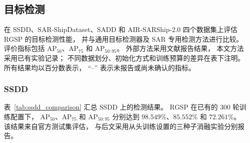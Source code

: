 \documentclass[journal]{IEEEtran}
\begin{document}
\subsection{目标检测}
\label{sec:detection_results}

在 SSDD、SAR-ShipDataset、SADD 和 AIR-SARShip-2.0
四个数据集上评估 RGSP 的目标检测性能，
并与通用目标检测器及 SAR 专用检测方法进行比较。
评价指标包括 AP$_{50}$、AP$_{75}$ 和 AP$_{50:95}$。
外部方法采用文献报告结果，
本文方法采用已有实验记录；
不同数据划分、初始化方式和训练预算的差异在表下注明。
所有结果均以百分数表示，
``--'' 表示未报告或尚未确认的指标。

\subsubsection{SSDD}
\label{sec:ssdd_results}

表~\ref{tab:ssdd_comparison}
汇总 SSDD 上的检测结果。
RGSP 在已有的 300 轮训练配置下，
AP$_{50}$、AP$_{75}$ 和 AP$_{50:95}$
分别达到 $98.549\%$、$85.552\%$ 和 $72.261\%$。
该结果来自官方测试集评估，
与后文采用从头训练设置的三种子消融实验分别报告。
\end{document}
